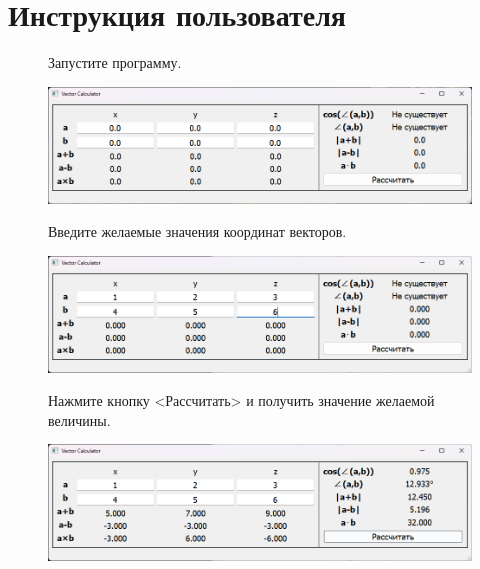 \label{sec:instruction}
\section{Инструкция пользователя}

\begin{enumerate}
    
    \begin{figure}[h!]
        \item Запустите программу.
        \vspace{0.3cm}
        

        \includegraphics[width=\textwidth]{img//instruction1}
        \caption{}
    \end{figure}

    
    \begin{figure}[h!]
        \item Введите желаемые значения координат векторов.
        \vspace{0.3cm}


        \includegraphics[width=\textwidth]{img//instruction2}
        \caption{}
    \end{figure}

    
    \begin{figure}[h!]
        \item Нажмите кнопку <Рассчитать> и получить значение желаемой величины.
        \vspace{0.3cm}


        \includegraphics[width=\textwidth]{img//instruction3}
        \caption{}
    \end{figure}

\end{enumerate}